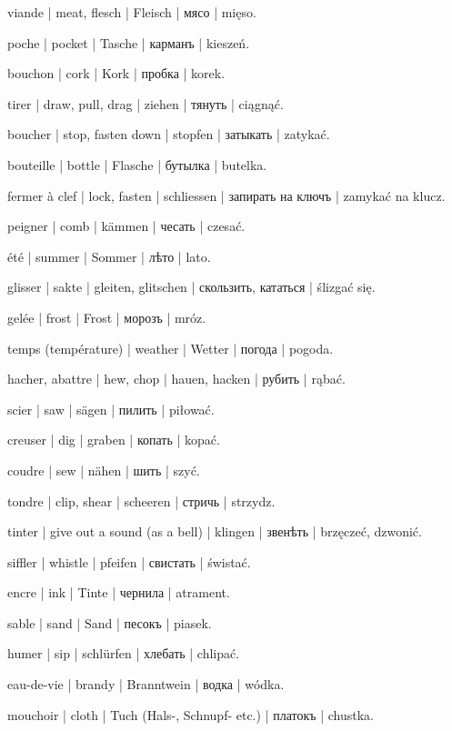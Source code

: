 \begin{ekzvocab}{1em}
 viande | meat, flesch | Fleisch | мясо | mięso.

 poche | pocket | Tasche | карманъ | kieszeń.

 bouchon | cork | Kork | пробка | korek.

 tirer | draw, pull, drag | ziehen | тянуть | ciągnąć.

 boucher | stop, fasten down | stopfen | затыкать | zatykać.

 bouteille | bottle | Flasche | бутылка | butelka.

 fermer à clef | lock, fasten | schliessen | запирать на ключъ | zamykać na klucz.

 peigner | comb | kämmen | чесать | czesać.

 été | summer | Sommer | лѣто | lato.

 glisser | sakte | gleiten, glitschen | скользить, кататься | ślizgać się.

 gelée | frost | Frost | морозъ | mróz.

 temps (température) | weather | Wetter | погода | pogoda.

 hacher, abattre | hew, chop | hauen, hacken | рубить | rąbać.

 scier | saw | sägen | пилить | piłować.

 creuser | dig | graben | копать | kopać.

 coudre | sew | nähen | шить | szyć.

 tondre | clip, shear | scheeren | стричь | strzydz.

 tinter | give out a sound (as a bell) | klingen | звенѣть | brzęczeć, dzwonić.

 siffler | whistle | pfeifen | свистать | świstać.

 encre | ink | Tinte | чернила | atrament.

 sable | sand | Sand | песокъ | piasek.

 humer | sip | schlürfen | хлебать | chlipać.

 eau-de-vie | brandy | Branntwein | водка | wódka.

 mouchoir | cloth | Tuch (Hals-, Schnupf- etc.) | платокъ | chustka.


\end{ekzvocab}
